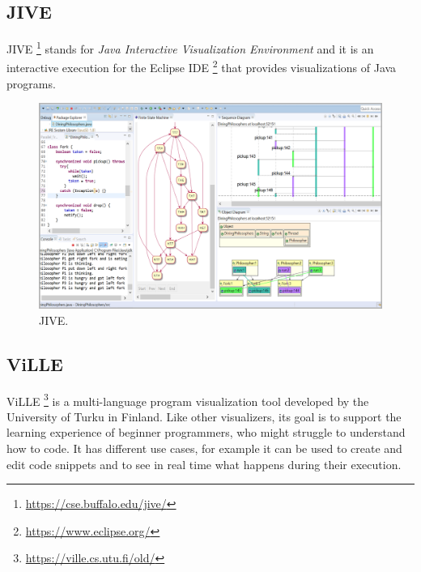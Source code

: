 \documentclass[]{usiinfbachelorproject}
\begin{document}
\subsection{JIVE}

JIVE \footnote{\url{https://cse.buffalo.edu/jive/}} stands for \emph{Java Interactive Visualization Environment} and it is an interactive execution for the Eclipse IDE \footnote{\url{https://www.eclipse.org/}} that provides visualizations of Java programs.

\begin{figure}[h!]
\centering
\includegraphics[width=\textwidth]{figures/jive.png}
\caption {JIVE.}
\end{figure}

\subsection{ViLLE}

ViLLE \footnote{\url{https://ville.cs.utu.fi/old/}} is a multi-language program visualization tool developed by the University of Turku in Finland. Like other visualizers, its goal is to support the learning experience of beginner programmers, who might struggle to understand how to code. It has different use cases, for example it can be used to create and edit code snippets and to see in real time what happens during their execution.
\end{document}
